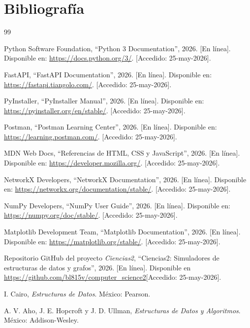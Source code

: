\documentclass[10pt,onecolumn]{IEEEtran}
\begin{document}
\section{Bibliografía}
\begin{thebibliography}{99}

Python Software Foundation, \enquote{Python 3 Documentation}, 2026. [En línea]. Disponible en: \url{https://docs.python.org/3/}. [Accedido: 25-may-2026].

FastAPI, \enquote{FastAPI Documentation}, 2026. [En línea]. Disponible en: \url{https://fastapi.tiangolo.com/}. [Accedido: 25-may-2026].

PyInstaller, \enquote{PyInstaller Manual}, 2026. [En línea]. Disponible en: \url{https://pyinstaller.org/en/stable/}. [Accedido: 25-may-2026].

Postman, \enquote{Postman Learning Center}, 2026. [En línea]. Disponible en: \url{https://learning.postman.com/}. [Accedido: 25-may-2026].

MDN Web Docs, \enquote{Referencias de HTML, CSS y JavaScript}, 2026. [En línea]. Disponible en: \url{https://developer.mozilla.org/}. [Accedido: 25-may-2026].

NetworkX Developers, \enquote{NetworkX Documentation}, 2026. [En línea]. Disponible en: \url{https://networkx.org/documentation/stable/}. [Accedido: 25-may-2026].

NumPy Developers, \enquote{NumPy User Guide}, 2026. [En línea]. Disponible en: \url{https://numpy.org/doc/stable/}. [Accedido: 25-may-2026].

Matplotlib Development Team, \enquote{Matplotlib Documentation}, 2026. [En línea]. Disponible en: \url{https://matplotlib.org/stable/}. [Accedido: 25-may-2026].

Repositorio GitHub del proyecto \textit{Ciencias2}, \enquote{Ciencias2: Simuladores de estructuras de datos y grafos}, 2026. [En línea]. Disponible en \url{https://github.com/bl815v/computer_science2}[Accedido: 25-may-2026].

I. Cairo, \textit{Estructuras de Datos}. México: Pearson.

A. V. Aho, J. E. Hopcroft y J. D. Ullman, \textit{Estructuras de Datos y Algoritmos}. México: Addison-Wesley.

\end{thebibliography}
\end{document}
